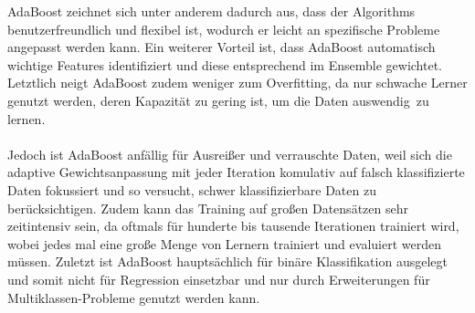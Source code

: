 AdaBoost zeichnet sich unter anderem dadurch aus, dass der Algorithms benutzerfreundlich und flexibel ist, wodurch er leicht an
spezifische Probleme angepasst werden kann. Ein weiterer Vorteil ist, dass AdaBoost automatisch wichtige Features identifiziert und diese
entsprechend im Ensemble gewichtet. Letztlich neigt AdaBoost zudem weniger zum Overfitting, da nur schwache Lerner genutzt werden, deren
Kapazität zu gering ist, um die Daten \glqq auswendig\grqq~zu lernen.\\\\
Jedoch ist AdaBoost anfällig für Ausreißer und verrauschte Daten, weil sich die adaptive Gewichtsanpassung mit jeder Iteration komulativ auf falsch
klassifizierte Daten fokussiert und so versucht, schwer klassifizierbare Daten zu berücksichtigen. Zudem kann das Training auf großen Datensätzen
sehr zeitintensiv sein, da oftmals für hunderte bis tausende Iterationen trainiert wird, wobei jedes mal eine große Menge von Lernern trainiert und evaluiert
werden müssen. Zuletzt ist AdaBoost hauptsächlich für binäre Klassifikation ausgelegt und somit nicht für Regression einsetzbar und
nur durch Erweiterungen für Multiklassen-Probleme genutzt werden kann.